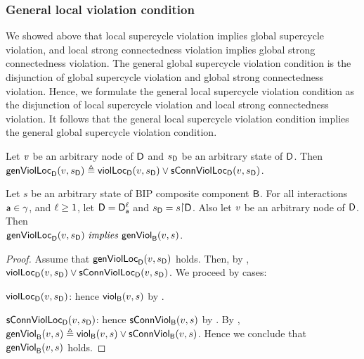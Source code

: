 \subsubsection{General local violation condition}

We showed above that local supercycle violation implies global supercycle violation, and local
strong connectedness violation implies global strong connectedness violation.  The general global
supercycle violation condition is the disjunction of global supercycle violation and global strong
connectedness violation.  Hence, we formulate the general local supercycle violation condition as the
disjunction of local supercycle violation and local strong connectedness violation.  It follows that
the general local supercycle violation condition implies the general global supercycle violation condition.


\begin{definition}
\label{def:locFormation.violation}
\label{defn:locFormation.violation}
Let $\mathit{v}$ be an arbitrary node of $\mathsf{D}$ and $s_\mathsf{D}$ be an arbitrary  state of $\mathsf{D}$.
Then $\mathsf{genViolLoc}_{\mathsf{D}}(v,s_\mathsf{D})  \triangleq \mathsf{violLoc}_{\mathsf{D}}(v,s_\mathsf{D}) \lor \mathsf{sConnViolLoc}_{\mathsf{D}}(v,s_\mathsf{D})$.
\end{definition}


\begin{proposition} 
\label{prop:locFromViol-implies-formViol}
\label{prop:locformviol-implies-formviol}
Let $s$ be an arbitrary state of BIP composite component $\mathsf{B}$.
For all interactions $\mathsf{a} \in \gamma$, and $\ell \ge 1$, let $\mathsf{D} = \mathsf{D}_{\mathsf{a}}^{\ell}$ and $\sD = s \pj \dsk{\act}{\l}$.
Also let $\mathit{v}$ be an arbitrary node of $\mathsf{D}$.
Then\\
\ind $ \locFormViol{v}{\sD}{\act}{\l}\ \impliess\ \genViol{v}{s}$.
\end{proposition}
%
\begin{proof}
Assume that $\mathsf{genViolLoc}_{\mathsf{D}}(v,s_\mathsf{D})$ holds. Then, by ,
$\mathsf{violLoc}_{\mathsf{D}}(v,s_\mathsf{D}) \lor \mathsf{sConnViolLoc}_{\mathsf{D}}(v,s_\mathsf{D})$.
We proceed by cases:
\bn
\item $\mathsf{violLoc}_{\mathsf{D}}(v,s_\mathsf{D})$: hence $\mathsf{viol}_{\mathsf{B}}(v,s)$ by .
\item $\mathsf{sConnViolLoc}_{\mathsf{D}}(v,s_\mathsf{D})$: hence $\mathsf{sConnViol}_{\mathsf{B}}(v,s)$ by .
\en
By ,  $\mathsf{genViol}_{\mathsf{B}}(v,s)  \triangleq \mathsf{viol}_{\mathsf{B}}(v,s)  \lor \mathsf{sConnViol}_{\mathsf{B}}(v,s)$.
Hence we conclude that $\mathsf{genViol}_{\mathsf{B}}(v,s)$ holds.
\end{proof}




